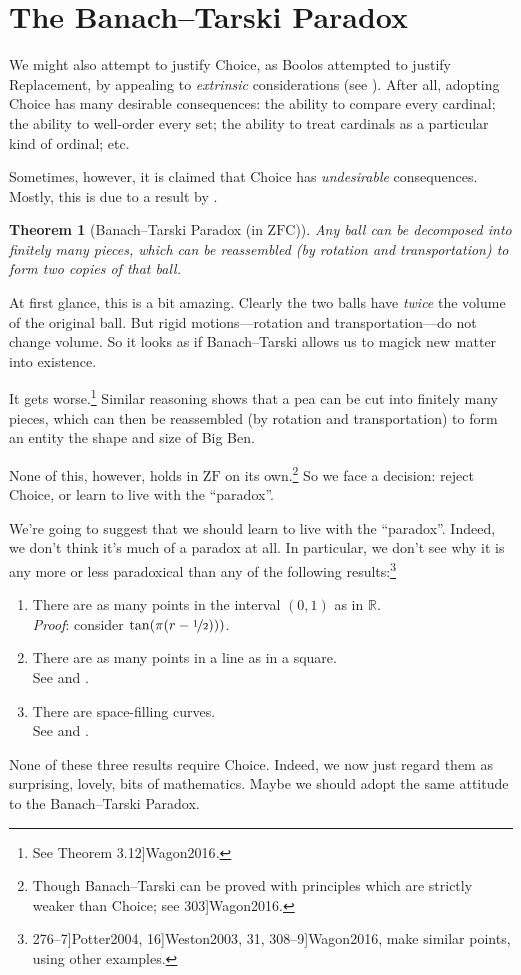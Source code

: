 \documentclass[10pt,a4paper]{article}
\makeatletter
\theoremstyle{plain}
\newtheorem{thm}{Theorem}[section]
\theoremstyle{definition}
\theoremstyle{remark}
\newcommand*{\olfileid}[3]{}
\newcommand*{\olsection}[1]{\section*{#1}}
\newcommand{\olref}{\@ifnextchar[{\olref@i}{\olref@final}}
\def\olref@i[#1]{\@ifnextchar[{\olref@ii}{\olref@final}}
\def\olref@ii[#1]{\@ifnextchar[{\olref@iii}{\olref@final}}
\def\olref@iii[#1]{\olref@final}
\def\olref@final#1{\ref{#1}}
\providecommand{\ZFC}{\mathrm{ZFC}}
\providecommand{\ZF}{\mathrm{ZF}}
\providecommand{\Real}{\mathbb{R}}
\providecommand{\citet}[1]{\cite{#1}}
\makeatother
\begin{document}


\olfileid{sth}{choice}{banach}
\olsection{The Banach--Tarski Paradox}

We might also attempt to justify Choice, as Boolos attempted to
justify Replacement, by appealing to \emph{extrinsic} considerations
(see \olref[replacement][extrinsic]{sec}). After all, adopting Choice
has many desirable consequences: the ability to compare every
cardinal; the ability to well-order every set; the ability to treat
cardinals as a particular kind of ordinal; etc. 

Sometimes, however, it is claimed that Choice has \emph{undesirable}
consequences. Mostly, this is due to a result by
\cite{BanachTarski1924}. 

\begin{thm}[Banach--Tarski Paradox (in $\ZFC$)]
Any ball can be decomposed into finitely many pieces, which can be
reassembled (by rotation and transportation) to form two copies of
that ball.
\end{thm}
\noindent 
At first glance, this is a bit amazing. Clearly the two balls have
\emph{twice} the volume of the original ball. But rigid
motions---rotation and transportation---do not change volume. So it
looks as if Banach--Tarski allows us to magick new matter into
existence.

It gets worse.\footnote{See \citet[Theorem 3.12]{Wagon2016}.} Similar
reasoning shows that a pea can be cut into finitely many pieces, which
can then be reassembled (by rotation and transportation) to form an
entity the shape and size of Big Ben.

None of this, however, holds in $\ZF$ on its own.\footnote{Though
Banach--Tarski can be proved with principles which are strictly weaker
than Choice; see \citet[303]{Wagon2016}.} So we face a decision:
reject Choice, or learn to live with the ``paradox''. 

We're going to suggest that we should learn to live with the
``paradox''. Indeed, we don't think it's much of a paradox at all. In
particular, we don't see why it is any more or less paradoxical than
any of the following results:\footnote{\citet[276--7]{Potter2004},
\citet[16]{Weston2003}, \citet[31, 308--9]{Wagon2016}, make
similar points, using other examples.}
\begin{enumerate}
	\item There are as many points in the interval $(0,1)$ as in  $\Real$. 
	\\\emph{Proof}: consider $\tan(\pi(r-\nicefrac{1}{2})))$.
	\item There are as many points in a line as in a square.
	\\See \olref[his][set][pathology]{sec} and \olref[his][set][cantorplane]{sec}.
	\item There are space-filling curves. 
	\\See \olref[his][set][pathology]{sec} and \olref[his][set][hilbertcurve]{sec}.
\end{enumerate}
None of these three results require Choice. Indeed, we now just regard
them as surprising, lovely, bits of mathematics. Maybe we should adopt
the same attitude to the Banach--Tarski Paradox.
\end{document}
